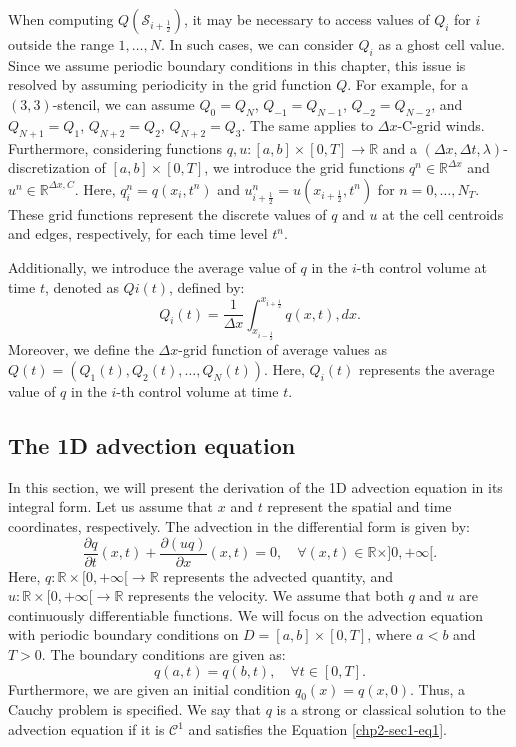 When computing $Q(\mathcal{S}_{i+\frac{1}{2}})$, it may be necessary to access values of $Q_i$ for $i$ outside the range $1,\ldots,N$.
In such cases, we can consider $Q_i$ as a ghost cell value.
Since we assume periodic boundary conditions in this chapter, this issue is resolved by assuming periodicity in the grid function $Q$.
For example, for a $(3,3)$-stencil, we can assume $Q_{0} = Q_{N}$, $Q_{-1} = Q_{N-1}$, $Q_{-2} = Q_{N-2}$, and
$Q_{N+1}=Q_1$, $Q_{N+2}=Q_2$, $Q_{N+2}=Q_3$. The same applies to $\Delta x$-C-grid winds.
Furthermore, considering functions $q, u: [a,b]\times[0,T] \to \mathbb{R}$ and a $(\Delta x,\Delta t, \lambda)$-discretization of $[a,b]\times[0,T]$, we introduce the grid functions $q^n \in \mathbb{R}^{\Delta x}$ and $u^n \in \mathbb{R}^{\Delta x,C}$. Here, ${q}^n_{i} = {q}(x_i, t^{n})$ and $u^n_{i+\frac{1}{2}} = u(x_{i+\frac{1}{2}},t^n)$ for $n=0, \ldots, N_T$. These grid functions represent the discrete values of $q$ and $u$ at the cell centroids and edges, respectively, for each time level $t^n$.

Additionally, we introduce the average value of $q$ in the $i$-th control volume at time $t$, denoted as ${Q}i(t)$, defined by:
\begin{equation}
	\label{chp2-sec1-not2}
	{Q}_i(t) = \frac{1}{\Delta x} \int_{x_{i-\frac{1}{2}}}^{x_{i+\frac{1}{2}}} {q}(x,t) ,dx.
\end{equation}
Moreover, we define the $\Delta x$-grid function of average values as $Q(t) = (Q_1(t), Q_2(t), \ldots, Q_N(t))$.
Here, $Q_i(t)$ represents the average value of $q$ in the $i$-th control volume at time $t$.

\subsection{The 1D advection equation}
In this section, we will present the derivation of the 1D advection equation in its integral form.
Let us assume that $x$ and $t$ represent the spatial and time coordinates, respectively.
The advection in the differential form is given by:
\begin{equation}
	\label{chp2-sec-adv-1}
	\frac{\partial q}{\partial t}(x, t) +
	\frac{\partial (uq)}{\partial x}(x, t)
	= 0, \quad \forall (x,t) \in \mathbb{R}\times ]0, +\infty[.
\end{equation}
Here, $q: \mathbb{R}\times[0, +\infty[ \to \mathbb{R}$ represents the advected quantity, 
and $u: \mathbb{R}\times[0, +\infty[ \to \mathbb{R}$ represents the velocity.
We assume that both $q$ and $u$ are continuously differentiable functions.
We will focus on the advection equation with periodic boundary conditions on 
$D = [a,b]\times[0,T]$, where $a<b$ and $T>0$. The boundary conditions are given as:
\begin{equation}
	\label{chp2-sec1-eq2}
	{q}(a, t) = {q}(b, t),\quad \forall t \in [0, T].
\end{equation}
Furthermore, we are given an initial condition $q_0(x) = q(x,0)$. Thus, a Cauchy problem is specified.
We say that ${q}$ is a strong or classical solution to the advection equation
if it is $\mathcal{C}^1$ and satisfies the Equation \eqref{chp2-sec1-eq1}.

